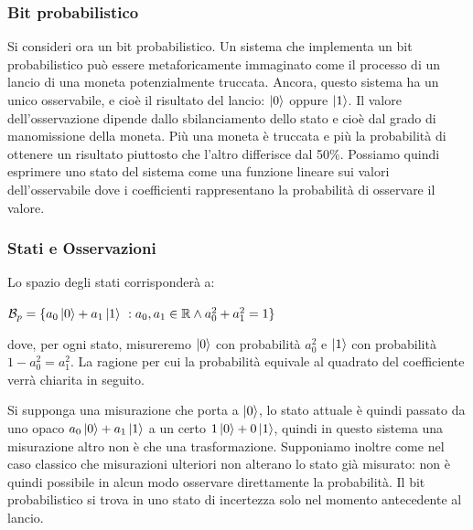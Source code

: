 \documentclass[12pt,a4paper,openright]{report}
\begin{document}
\subsubsection{Bit probabilistico}
Si consideri ora un bit probabilistico. Un sistema che implementa un bit probabilistico può essere metaforicamente immaginato come il processo di un lancio
di una moneta potenzialmente truccata. Ancora, questo sistema ha un unico osservabile, e cioè il risultato del lancio: $\ket{0}$ oppure $\ket1$.
Il valore dell'osservazione dipende dallo sbilanciamento dello stato e cioè dal grado di manomissione della moneta. Più una moneta è truccata e più la probabilità
di ottenere un risultato piuttosto che l'altro differisce dal 50$\%$. Possiamo quindi esprimere uno stato del sistema come una funzione lineare sui valori dell'osservabile
dove i coefficienti rappresentano la probabilità di osservare il valore. \newpage
\subsubsection{Stati e Osservazioni} 
Lo spazio degli stati corrisponderà a:

\begin{center}
    $ \mathcal{B}_p = \{a_0\ket0 + a_1\ket1 \ : a_0,a_1 \in{\mathbb{R}} \land a_0^2+a_1^2 = 1\}$
\end{center}

\noindent dove, per ogni stato, misureremo $\ket0$ con probabilità $a_0^2$ e $\ket1$ con probabilità $1 - a_0^2 = a_1^2$.
La ragione per cui la probabilità equivale al quadrato del coefficiente verrà chiarita in seguito.\par
Si supponga una misurazione che porta a $\ket0$, lo stato attuale è quindi passato da uno opaco $a_0\ket0 + a_1\ket1$ a un certo $1\ket0+0\ket1$,
quindi in questo sistema una misurazione altro non è che una trasformazione. Supponiamo inoltre come nel caso classico che misurazioni ulteriori non alterano lo stato già
misurato: non è quindi possibile in alcun modo osservare direttamente la probabilità. Il bit probabilistico si trova
in uno stato di incertezza solo nel momento antecedente al lancio.
\end{document}
